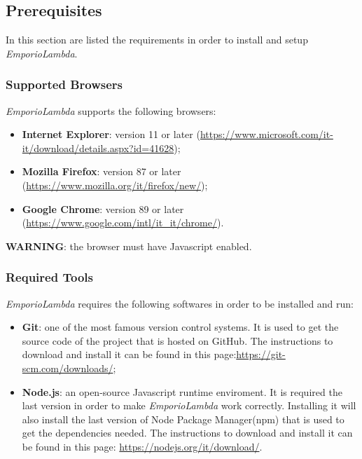 \subsection{Prerequisites}
In this section are listed the requirements in order to install and setup \textit{EmporioLambda}.

\subsubsection{Supported Browsers}
\textit{EmporioLambda} supports the following browsers:
\begin{itemize}
\item \textbf{Internet Explorer}: version 11 or later (\url{https://www.microsoft.com/it-it/download/details.aspx?id=41628});
\item \textbf{Mozilla Firefox}: version 87 or later (\url{https://www.mozilla.org/it/firefox/new/});
\item \textbf{Google Chrome}: version 89 or later (\url{https://www.google.com/intl/it_it/chrome/}).
\end{itemize}
\textbf{WARNING}: the browser must have Javascript enabled.

\subsubsection{Required Tools}
\textit{EmporioLambda} requires the following softwares in order to be installed and run:
\begin{itemize}
\item \textbf{Git}: one of the most famous version control systems. It is used to get the source code of the project that is hosted on GitHub. The instructions to download and install it can be found in this page:\url{https://git-scm.com/downloads/};
\item \textbf{Node.js}: an open-source Javascript runtime enviroment. It is required the last version in order to make \textit{EmporioLambda} work correctly. Installing it will also install the last version of Node Package Manager(npm) that is used to get the dependencies needed. The instructions to download and install it can be found in this page: \url{https://nodejs.org/it/download/}.
\end{itemize}

